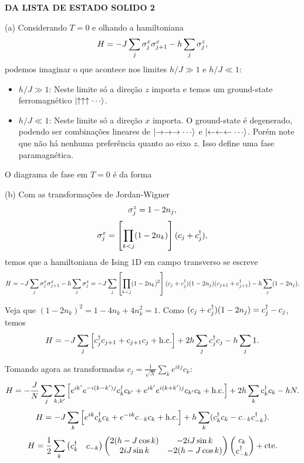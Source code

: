 \documentclass[a4paper,10pt]{article}
\begin{document}
\n\n\n\n\n\n\n\n\n\n\n

\textbf{DA LISTA DE ESTADO SOLIDO 2}

(a) Considerando $T = 0$ e olhando a hamiltoniana
$$
H = -J \sum_{j} \sigma_j^x \sigma_{j+1}^x - h \sum_{j} \sigma_j^z,
$$
podemos imaginar o que acontece nos limites $h/J \gg 1$ e $h/J \ll 1$:
\begin{itemize}
\item $h / J \gg 1$: Neste limite só a direção $z$ importa e temos um ground-state ferromagnético $\ket{\uparrow\uparrow\uparrow\cdots}$.

\item $h / J \ll 1$: Neste limite só a direção $x$ importa. O ground-state é degenerado, podendo ser combinações lineares de $\ket{\rightarrow\rightarrow\rightarrow\cdots}$ e $\ket{\leftarrow\leftarrow\leftarrow\cdots}$. Porém note que não há nenhuma preferência quanto ao eixo $z$. Isso define uma fase paramagnética.
\end{itemize}

O diagrama de fase em $T = 0$ é da forma


\n

(b) Com as transformações de Jordan-Wigner
$$
\sigma_j^z = 1 - 2 n_j,
$$
$$
\sigma_j^x = \qty[\prod_{k < j} (1-2n_k)] (c_j + c_j^\dagger),
$$
temos que a hamiltoniana de Ising 1D em campo transverso se escreve
$$
H = -J \sum_{j} \sigma_j^x \sigma_{j+1}^x - h \sum_{j} \sigma_j^z =
-J \sum_{j} \qty[\prod_{k<j} (1 - 2n_k)^2] (c_j+c_j^\dagger)(1-2n_j)(c_{j+1} + c_{j+1}^\dagger) - h \sum_{j} (1-2n_j).
$$

Veja que $(1-2n_k)^2 = 1 - 4 n_k + 4 n_k^2 = 1$. Como $(c_j+c_j^\dagger)(1-2n_j) = c_j^\dagger - c_j$, temos
\begin{equation} \label{eq:hamil_transvising}
H = -J \sum_{j} \qty[ c_j^\dagger c_{j+1} + c_{j+1} c_j + \text{h.c.} ]
+ 2h \sum_{j} c_j^\dagger c_j - h \sum_{j} 1.
\end{equation}

Tomando agora as transformadas $c_j = \frac{1}{\sqrt{N}} \sum_{k} e^{ikj} c_k$:
$$
H =
-\frac{J}{N} \sum_{j} \sum_{k,k'} \qty[ e^{ik'} e^{-i(k-k')j} c_k^\dagger c_{k'} + e^{ik'} e^{i(k+k')j} c_{k'} c_k + \text{h.c.} ]
+ 2h \sum_{k} c_k^\dagger c_k - h N.
$$
$$
H =
-J \sum_{k} \qty[ e^{ik} c_k^\dagger c_{k} + e^{-ik} c_{-k} c_k + \text{h.c.} ]
+ h \sum_{k} (c_k^\dagger c_k - c_{-k} c_{-k}^\dagger).
$$
$$
H =
\frac{1}{2}
\sum_{k}
\begin{pmatrix}
c_k^\dagger & c_{-k}
\end{pmatrix}
\begin{pmatrix}
2(h - J \cos k) & -2iJ \sin k \\
2iJ \sin k & -2(h - J\cos k)
\end{pmatrix}
\begin{pmatrix}
c_k \\ c_{-k}^\dagger
\end{pmatrix}
+ \text{cte}.
$$
\end{document}
